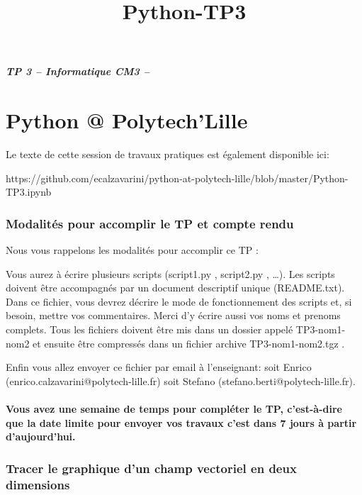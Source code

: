 \documentclass{article}
\title{Python-TP3}
\begin{document}
    
    \date{}
    \maketitle
    
    

    
    \subparagraph{TP 3 -- Informatique CM3 --}\label{tp-3-informatique-cm3}

    \section{Python @ Polytech'Lille}\label{python-polytechlille}

    Le texte de cette session de travaux pratiques est également disponible
ici:

https://github.com/ecalzavarini/python-at-polytech-lille/blob/master/Python-TP3.ipynb

    \subsubsection{Modalités pour accomplir le TP et compte
rendu}\label{modalituxe9s-pour-accomplir-le-tp-et-compte-rendu}

    Nous vous rappelons les modalités pour accomplir ce TP :

Vous aurez à écrire plusieurs scripts (script1.py , script2.py ,
\ldots{}). Les scripts doivent être accompagnés par un document
descriptif unique (README.txt). Dans ce fichier, vous devrez décrire le
mode de fonctionnement des scripts et, si besoin, mettre vos
commentaires. Merci d'y écrire aussi vos noms et prenoms complets. Tous
les fichiers doivent être mis dans un dossier appelé TP3-nom1-nom2 et
ensuite être compressés dans un fichier archive TP3-nom1-nom2.tgz .

Enfin vous allez envoyer ce fichier par email à l'enseignant: soit
Enrico (enrico.calzavarini@polytech-lille.fr) soit Stefano
(stefano.berti@polytech-lille.fr).

    \paragraph{Vous avez une semaine de temps pour compléter le TP,
c'est-à-dire que la date limite pour envoyer vos travaux c'est dans 7
jours à partir
d'aujourd'hui.}\label{vous-avez-une-semaine-de-temps-pour-compluxe9ter-le-tp-cest-uxe0-dire-que-la-date-limite-pour-envoyer-vos-travaux-cest-dans-7-jours-uxe0-partir-daujourdhui.}

    \subsubsection{Tracer le graphique d'un champ vectoriel en deux
dimensions}\label{tracer-le-graphique-dun-champ-vectoriel-en-deux-dimensions}
\end{document}
